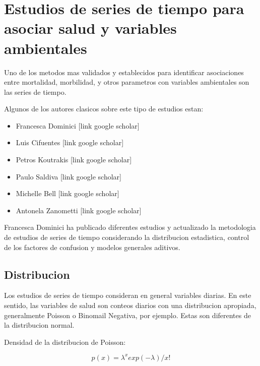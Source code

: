 \documentclass[]{book}
\providecommand{\tightlist}{%
  \setlength{\itemsep}{0pt}\setlength{\parskip}{0pt}}
\begin{document}
\hypertarget{estudios-de-series-de-tiempo-para-asociar-salud-y-variables-ambientales}{%
\chapter{Estudios de series de tiempo para asociar salud y variables ambientales}\label{estudios-de-series-de-tiempo-para-asociar-salud-y-variables-ambientales}}

Uno de los metodos mas validados y establecidos para identificar asociaciones entre mortalidad, morbilidad, y otros parametros con variables ambientales son las series de tiempo.

Algunos de los autores clasicos sobre este tipo de estudios estan:

\begin{itemize}
\tightlist
\item
  Francesca Dominici {[}link google scholar{]}
\item
  Luis Cifuentes {[}link google scholar{]}
\item
  Petros Koutrakis {[}link google scholar{]}
\item
  Paulo Saldiva {[}link google scholar{]}
\item
  Michelle Bell {[}link google scholar{]}
\item
  Antonela Zanometti {[}link google scholar{]}
\end{itemize}

Francesca Dominici ha publicado diferentes estudios y actualizado la metodologia de estudios de series de tiempo considerando la distribucion estadistica, control de los factores de confusion y modelos generales aditivos.

\hypertarget{distribucion}{%
\section{Distribucion}\label{distribucion}}

Los estudios de series de tiempo consideran en general variables diarias. En este sentido, las variables de salud son conteos diarios con una distribucion apropiada, generalmente Poisson o Binomail Negativa, por ejemplo. Estas son diferentes de la distribucion normal.

Densidad de la distribucion de Poisson:

\begin{equation}
p(x) = \lambda^x exp(-\lambda)/x!
\label{eq:12}
\end{equation}
\end{document}
